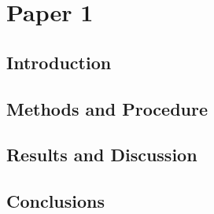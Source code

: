 \chapter{Paper 1}\label{ch:Paper1}
  \section{Introduction}\label{sec:P1Introduction}
    \lipsum[34-36]
  \section{Methods and Procedure}\label{sec:P1methodsAndProcedure}
    \begin{case}
      \lipsum[10]
    \end{case}
    \begin{case}
      \lipsum[15]
    \end{case}
    \lipsum[46-48]
  \section{Results and Discussion}\label{sec:P1resultsAndDiscussion}
    \lipsum[55-57]
  \section{Conclusions}\label{sec:P1Conclusions}
    \lipsum[12-13]